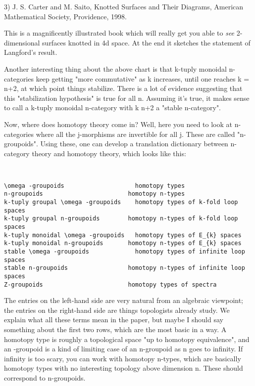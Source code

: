 3) J. S. Carter and M. Saito, Knotted Surfaces and Their Diagrams,
American Mathematical Society, Providence, 1998.

This is a magnificently illustrated book which will really get you
able to \emph{see} 2-dimensional surfaces knotted in 4d space.  At the end
it sketches the statement of Langford's result.

Another interesting thing about the above chart is that k-tuply
monoidal n-categories keep getting "more commutative" as k increases,
until one reaches k = n+2, at which point things stabilize.  There is
a lot of evidence suggesting that this "stabilization hypothesis" is
true for all n.  Assuming it's true, it makes sense to call a k-tuply
monoidal n-category with k \ge  n+2 a "stable n-category".

Now, where does homotopy theory come in?  Well, here you need to look
at n-categories where all the j-morphisms are invertible for all j.
These are called "n-groupoids".  Using these, one can develop a
translation dictionary between n-category theory and homotopy theory,
which looks like this:


\begin{verbatim}


\omega -groupoids                    homotopy types 
n-groupoids                        homotopy n-types
k-tuply groupal \omega -groupoids    homotopy types of k-fold loop spaces
k-tuply groupal n-groupoids        homotopy n-types of k-fold loop spaces 
k-tuply monoidal \omega -groupoids   homotopy types of E_{k} spaces 
k-tuply monoidal n-groupoids       homotopy n-types of E_{k} spaces
stable \omega -groupoids             homotopy types of infinite loop spaces
stable n-groupoids                 homotopy n-types of infinite loop spaces 
Z-groupoids                        homotopy types of spectra  

\end{verbatim}
    
The entries on the left-hand side are very natural from an algebraic
viewpoint; the entries on the right-hand side are things topologists
already study.  We explain what all these terms mean in the paper, but
maybe I should say something about the first two rows, which are the
most basic in a way.  A homotopy type is roughly a topological space
"up to homotopy equivalence", and an \omega -groupoid is a kind of
limiting case of an n-groupoid as n goes to infinity.  If infinity is
too scary, you can work with homotopy n-types, which are basically
homotopy types with no interesting topology above dimension n.  These
should correspond to n-groupoids.

